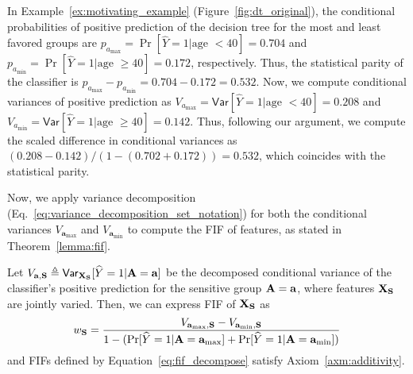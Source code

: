 \begin{example}
	\normalfont
	In Example~\ref{ex:motivating_example} (Figure~\ref{fig:dt_original}), the conditional probabilities of positive prediction of the decision tree for the most and least favored groups are $  p_{a_{\max}} = \Pr[\widehat{Y} = 1 | \text{age } < 40] = 0.704 $ and $ p_{a_{\min}} = \Pr[\widehat{Y} = 1 | \text{age } \ge 40] = 0.172 $, respectively. Thus, the statistical parity of the classifier is $ p_{a_{\max}} - p_{a_{\min}} = 0.704 - 0.172 =  0.532 $. Now, we compute conditional variances of positive prediction as $ V_{a_{\max}} = \mathsf{Var}[\widehat{Y} = 1| \text{age } < 40] = 0.208 $ and $ V_{a_{\min}} = \mathsf{Var}[\widehat{Y} = 1| \text{age } \ge 40] = 0.142 $. Thus, following our argument, we compute the scaled difference in conditional variances as $ (0.208 - 0.142)/(1 - (0.702 + 0.172)) = 0.532 $, which coincides with the statistical parity.
\end{example}
Now, we apply variance decomposition (Eq.~\eqref{eq:variance_decomposition_set_notation}) for both the conditional variances $ V_{\mathbf{a}_{\max}} $ and $ V_{\mathbf{a}_{\min}} $ to compute the FIF of features, as stated in Theorem~\ref{lemma:fif}.
\begin{theorem}
	\label{lemma:fif}
	Let $ V_{\mathbf{a}, \mathbf{S}} \triangleq \mathsf{Var}_{\mathbf{X}_{\mathbf{S}}}[\widehat{Y} = 1|\mathbf{A} = \mathbf{a}] $ be the decomposed conditional variance of the classifier's positive prediction for the sensitive group $ \mathbf{A} = \mathbf{a} $, where features $ \mathbf{X}_{\mathbf{S}} $ are jointly varied. Then, we can express FIF of $ \mathbf{X}_{\mathbf{S}} $ as
	\begin{equation}\label{eq:fif_decompose}
	w_{\mathbf{S}}  = \frac{V_{\mathbf{a}_{\max},\mathbf{S}} - V_{\mathbf{a}_{\min},\mathbf{S}}}{1 - (\Pr[\widehat{Y} = 1 |  \mathbf{A} = \mathbf{a}_{\max}] + \Pr[\widehat{Y} = 1 |  \mathbf{A} = \mathbf{a}_{\min}])}
	\end{equation}
	and FIFs defined by Equation~\eqref{eq:fif_decompose} satisfy Axiom~\ref{axm:additivity}.
\end{theorem}

